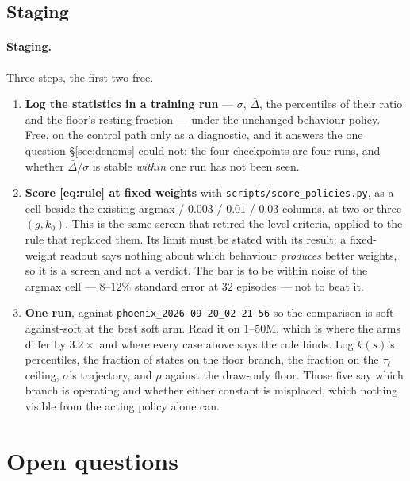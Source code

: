 \documentclass{article}
\newcommand{\gapbar}{\overline{\Delta}}
\newcommand{\srank}{\sigma}
\begin{document}
\subsection{Staging}
\label{sec:staging}

\paragraph{Staging.} Three steps, the first two free.

\begin{enumerate}
  \item \textbf{Log the statistics in a training run} --- $\srank$, $\gapbar$, the percentiles
  of their ratio and the floor's resting fraction --- under the unchanged behaviour policy. Free,
  on the control path only as a diagnostic, and it answers the one question
  \S\ref{sec:denoms} could not: the four checkpoints are four runs, and whether
  $\gapbar/\srank$ is stable \emph{within} one run has not been seen.
  \item \textbf{Score \eqref{eq:rule} at fixed weights} with \texttt{scripts/score\_policies.py},
  as a cell beside the existing argmax / $0.003$ / $0.01$ / $0.03$ columns, at two or three
  $(g, k_0)$. This is the same screen that retired the level criteria, applied to the rule that
  replaced them. Its limit must be stated with its result: a fixed-weight readout says nothing
  about which behaviour \emph{produces} better weights, so it is a screen and not a verdict. The
  bar is to be within noise of the argmax cell --- $8$--$12\%$ standard error at $32$ episodes ---
  not to beat it.
  \item \textbf{One run}, against \texttt{phoenix\_2026-09-20\_02-21-56} so the comparison is
  soft-against-soft at the best soft arm. Read it on $1$--$50$M, which is where the arms differ by
  $3.2\times$ and where every case above says the rule binds. Log $k(s)$'s percentiles, the
  fraction of states on the floor branch, the fraction on the $\tau_\ell$ ceiling, $\srank$'s
  trajectory, and $\rho$ against the draw-only floor. Those five say which branch is operating and
  whether either constant is misplaced, which nothing visible from the acting policy alone can.
\end{enumerate}

\section{Open questions}
\label{sec:owed}
\end{document}
